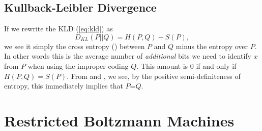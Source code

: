 \section{Kullback-Leibler Divergence}\label{sec:kld}
If we rewrite the KLD (\ref{eq:kld}) as%
\begin{equation}%
  D_{KL}(P||Q)=H(P,Q) - S(P), \label{eq:kld-entropies}
\end{equation}%
we see it simply the cross entropy () between
$P$ and $Q$ minus the entropy over $P$. In other words this is the
average number of \textit{additional} bits we need to identify $x$
from $P$ when using the improper coding $Q$. This amount is $0$ if and
only if $H(P,Q)=S(P)$. From  and
, we see, by the positive semi-definiteness of
entropy, this immediately implies that $P$=$Q$.

\chapter{Restricted Boltzmann Machines}
